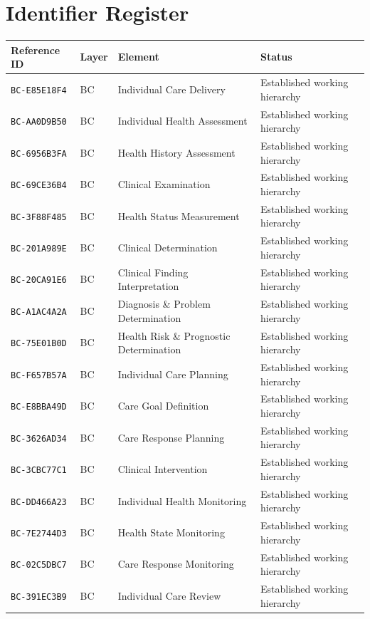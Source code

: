 \documentclass[11pt,a4paper,openany]{book}
\begin{document}
\chapter{Identifier Register}
\small\begin{longtable}{@{}p{.19\linewidth}p{.12\linewidth}p{.39\linewidth}p{.24\linewidth}@{}}\toprule Reference ID & Layer & Element & Status \\ \midrule\endhead
\texttt{BC-E85E18F4} & BC & Individual Care Delivery & Established working hierarchy \\
\texttt{BC-AA0D9B50} & BC & Individual Health Assessment & Established working hierarchy \\
\texttt{BC-6956B3FA} & BC & Health History Assessment & Established working hierarchy \\
\texttt{BC-69CE36B4} & BC & Clinical Examination & Established working hierarchy \\
\texttt{BC-3F88F485} & BC & Health Status Measurement & Established working hierarchy \\
\texttt{BC-201A989E} & BC & Clinical Determination & Established working hierarchy \\
\texttt{BC-20CA91E6} & BC & Clinical Finding Interpretation & Established working hierarchy \\
\texttt{BC-A1AC4A2A} & BC & Diagnosis \& Problem Determination & Established working hierarchy \\
\texttt{BC-75E01B0D} & BC & Health Risk \& Prognostic Determination & Established working hierarchy \\
\texttt{BC-F657B57A} & BC & Individual Care Planning & Established working hierarchy \\
\texttt{BC-E8BBA49D} & BC & Care Goal Definition & Established working hierarchy \\
\texttt{BC-3626AD34} & BC & Care Response Planning & Established working hierarchy \\
\texttt{BC-3CBC77C1} & BC & Clinical Intervention & Established working hierarchy \\
\texttt{BC-DD466A23} & BC & Individual Health Monitoring & Established working hierarchy \\
\texttt{BC-7E2744D3} & BC & Health State Monitoring & Established working hierarchy \\
\texttt{BC-02C5DBC7} & BC & Care Response Monitoring & Established working hierarchy \\
\texttt{BC-391EC3B9} & BC & Individual Care Review & Established working hierarchy \\

\end{longtable}
\end{document}
